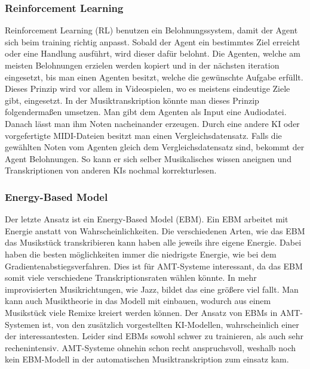 \subsubsection{Reinforcement Learning}
Reinforcement Learning (RL) benutzen ein Belohnungssystem, damit der Agent sich beim training richtig anpasst.
Sobald der Agent ein bestimmtes Ziel erreicht oder eine Handlung ausführt, wird dieser dafür belohnt.
Die Agenten, welche am meisten Belohnungen erzielen werden kopiert und in der nächsten iteration eingesetzt,
bis man einen Agenten besitzt, welche die gewünschte Aufgabe erfüllt.
Dieses Prinzip wird vor allem in Videospielen, wo es meistens eindeutige Ziele gibt, eingesetzt.
In der Musiktranskription könnte man dieses Prinzip folgendermaßen umsetzen.
Man gibt dem Agenten als Input eine Audiodatei.
Danach lässt man ihm Noten nacheinander erzeugen.
Durch eine andere KI oder vorgefertigte MIDI-Dateien besitzt man einen Vergleichsdatensatz.
Falls die gewählten Noten vom Agenten gleich dem Vergleichsdatensatz sind, bekommt der Agent Belohnungen.
So kann er sich selber Musikalisches wissen aneignen und Transkriptionen von anderen KIs nochmal korrekturlesen.
\cite{li2018music}

\subsubsection{Energy-Based Model}
Der letzte Ansatz ist ein Energy-Based Model (EBM).
Ein EBM arbeitet mit Energie anstatt von Wahrscheinlichkeiten.
\cite{lecun2006tutorial}
Die verschiedenen Arten, wie das EBM das Musikstück transkribieren kann haben alle jeweils ihre eigene Energie.
Dabei haben die besten möglichkeiten immer die niedrigste Energie, wie bei dem Gradientenabstiegsverfahren.
Dies ist für AMT-Systeme interessant, da das EBM somit viele verschiedene Transkriptionsraten wählen könnte.
In mehr improvisierten Musikrichtungen, wie Jazz, bildet das eine größere viel fallt.
Man kann auch Musiktheorie in das Modell mit einbauen, wodurch aus einem Musikstück viele Remixe kreiert werden können.
Der Ansatz von EBMs in AMT-Systemen ist,
von den zusätzlich vorgestellten KI-Modellen, wahrscheinlich einer der interessantesten.
Leider sind EBMs sowohl schwer zu trainieren, als auch sehr rechenintensiv.
AMT-Systeme ohnehin schon recht anspruchsvoll,
weshalb noch kein EBM-Modell in der automatischen Musiktranskription zum einsatz kam.

